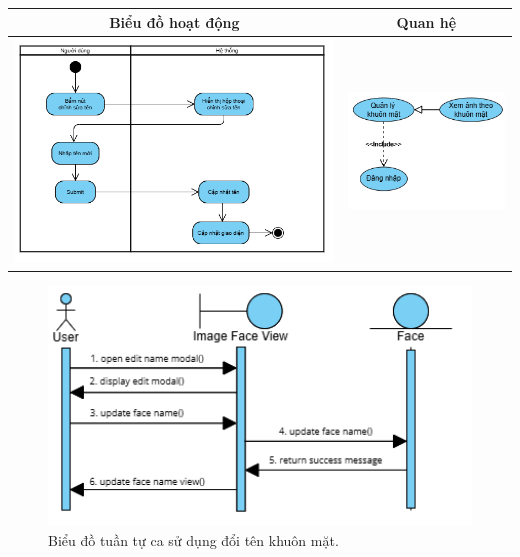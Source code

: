 \noindent 
\begin{tabular}{| c | c |}
    \hline
    \textbf{Biểu đồ hoạt động} & \textbf{Quan hệ} \\ 
    \hline
    \includegraphics[width=0.6\linewidth]{figures/c3/3-3-12-activity-diagram.png} 
    &  
    \includegraphics[width=0.35\linewidth]{figures/c3/3-3-12-relationship.png} \\ 
    \hline
\end{tabular}

\begin{figure}[H]
    \centering  
    \includegraphics[width=1\textwidth]{figures/c3/3-3-12-sequence-diagram.png}
    \caption{Biểu đồ tuần tự ca sử dụng đổi tên khuôn mặt.}
    \label{fig:3-3-12-sequence-diagram}
\end{figure}